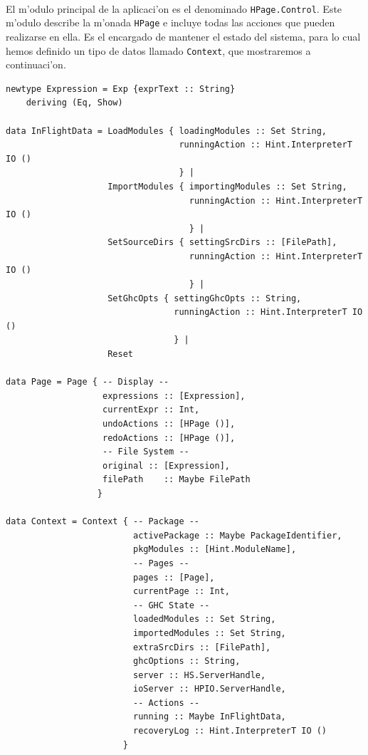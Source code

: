 \documentclass[a4paper]{article}
\begin{document}
\paragraph{}El m'odulo principal de la aplicaci'on es el denominado \texttt{HPage.Control}.  Este m'odulo describe la m'onada \texttt{HPage} e incluye todas las acciones que pueden realizarse en ella.  Es el encargado de mantener el estado del sistema, para lo cual hemos definido un tipo de datos llamado \texttt{Context}, que mostraremos a continuaci'on.
\begin{center}\begin{lstlisting}
newtype Expression = Exp {exprText :: String}       
    deriving (Eq, Show)

data InFlightData = LoadModules { loadingModules :: Set String,
                                  runningAction :: Hint.InterpreterT IO ()
                                  } |
                    ImportModules { importingModules :: Set String,
                                    runningAction :: Hint.InterpreterT IO ()
                                    } | 
                    SetSourceDirs { settingSrcDirs :: [FilePath],
                                    runningAction :: Hint.InterpreterT IO ()
                                    } |
                    SetGhcOpts { settingGhcOpts :: String,
                                 runningAction :: Hint.InterpreterT IO ()
                                 } |
                    Reset

data Page = Page { -- Display --
                   expressions :: [Expression],
                   currentExpr :: Int,
                   undoActions :: [HPage ()],
                   redoActions :: [HPage ()],
                   -- File System --
                   original :: [Expression],
                   filePath    :: Maybe FilePath
                  }
                  
data Context = Context { -- Package --
                         activePackage :: Maybe PackageIdentifier,
                         pkgModules :: [Hint.ModuleName],
                         -- Pages --
                         pages :: [Page],
                         currentPage :: Int,
                         -- GHC State --
                         loadedModules :: Set String,
                         importedModules :: Set String,
                         extraSrcDirs :: [FilePath],
                         ghcOptions :: String,
                         server :: HS.ServerHandle,
                         ioServer :: HPIO.ServerHandle,
                         -- Actions --
                         running :: Maybe InFlightData,
                         recoveryLog :: Hint.InterpreterT IO ()
                       }
\end{lstlisting}\end{center}
\end{document}
